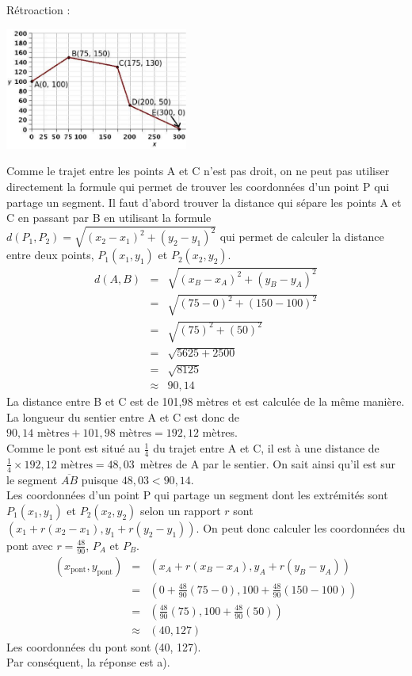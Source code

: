 \documentclass[letterpaper, 12pt]{article}
\begin{document}
R\'etroaction :\\
\begin{center}
 \includegraphics[width=6cm,bb=14 14 531 362]{Q2468.eps}
\end{center}
Comme le trajet entre les points A et C n'est pas droit, on ne peut pas utiliser directement la formule qui permet de trouver les coordonn\'ees d'un point P qui partage un segment. Il faut d'abord trouver la distance qui s\'epare les points A et C en passant par B en utilisant la formule $d(P_{1}, P_{2})=\sqrt{(x_{2}-x_{1})^{2}+(y_{2}-y_{1})^{2}}$ qui permet de calculer la distance entre deux points, $P_{1}(x_{1}, y_{1})$ et  $P_{2}(x_{2}, y_{2})$.
\begin{eqnarray*}
 d(A, B)&=&\sqrt{(x_{B}-x_{A})^{2}+(y_{B}-y_{A})^{2}}\\
&=&\sqrt{(75-0)^{2}+(150-100)^{2}}\\
&=&\sqrt{(75)^{2}+(50)^{2}}\\
&=&\sqrt{5625+2500}\\
&=&\sqrt{8125}\\
&\approx&90,14
\end{eqnarray*}
La distance entre B et C est de 101,98 m\`etres et est calcul\'ee de la m\^eme mani\`ere. La longueur du sentier entre A et C est donc de $90,14\textrm{ m\`etres}+101,98\textrm{ m\`etres}=192,12$ m\`etres.\\
Comme le pont est situ\'e au $\frac{1}{4}$ du trajet entre A et C, il est \`a une distance de \mbox{$\frac{1}{4}\times 192,12\textrm{ m\`etres}=48,03$ m\`etres} de A par le sentier. On sait ainsi qu'il est sur le segment $\overline{AB}$ puisque $48,03<90,14$.\\

Les coordonn\'ees d'un point P qui partage un segment dont les extr\'emit\'es sont $P_{1}(x_{1}, y_{1})$ et $P_{2}(x_{2}, y_{2})$ selon un rapport $r$ sont $\left( x_{1}+r(x_{2}-x_{1}), y_{1}+r(y_{2}-y_{1})\right) $. On peut donc calculer les coordonn\'ees du pont avec $r=\frac{48}{90}$, $P_{A}$ et $P_{B}$.
\begin{eqnarray*}
(x_{\textrm{pont}}, y_{\textrm{pont}})&=& \left( x_{A}+r(x_{B}-x_{A}), y_{A}+r(y_{B}-y_{A})\right)\\
&=& \left( 0+\frac{48}{90}(75-0), 100+\frac{48}{90}(150-100)\right)\\
&=& \left( \frac{48}{90}(75), 100+\frac{48}{90}(50)\right)\\
&\approx& \left( 40, 127\right)
\end{eqnarray*}
Les coordonn\'ees du pont sont (40, 127).\\
Par cons\'equent, la r\'eponse est a).\\
\end{document}
